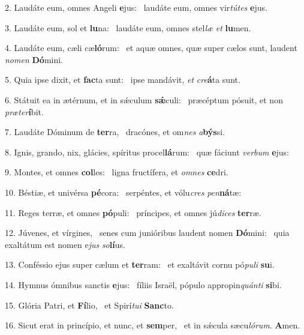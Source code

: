 2. Laudáte eum, omnes Angeli \textbf{e}jus: \ast\  laudáte eum, omnes vir\textit{tú}\textit{tes} \textbf{e}jus.\

3. Laudáte eum, sol et \textbf{lu}na: \ast\  laudáte eum, omnes stel\textit{læ} \textit{et} \textbf{lu}men.\

4. Laudáte eum, cæli cæ\textbf{ló}rum: \ast\  et aquæ omnes, quæ super cælos sunt, laudent \textit{no}\textit{men} \textbf{Dó}mini.\

5. Quia ipse dixit, et \textbf{fac}ta sunt: \ast\  ipse mandávit, \textit{et} \textit{cre}\textbf{á}ta sunt.\

6. Státuit ea in ætérnum, et in sǽculum \textbf{sǽ}culi: \ast\  præcéptum pósuit, et non \textit{præ}\textit{ter}\textbf{í}bit.\

7. Laudáte Dóminum de \textbf{ter}ra, \ast\  dracónes, et om\textit{nes} \textit{a}\textbf{býs}si.\

8. Ignis, grando, nix, glácies, spíritus procel\textbf{lá}rum: \ast\  quæ fáciunt \textit{ver}\textit{bum} \textbf{e}jus:\

9. Montes, et omnes \textbf{col}les: \ast\  ligna fructífera, et \textit{om}\textit{nes} \textbf{ce}dri.\

10. Béstiæ, et univérsa \textbf{pé}cora: \ast\  serpéntes, et vólu\textit{cres} \textit{pen}\textbf{ná}tæ:\

11. Reges terræ, et omnes \textbf{pó}puli: \ast\  príncipes, et omnes jú\textit{di}\textit{ces} \textbf{ter}ræ.\

12. Júvenes, et vírgines, \dag\  senes cum junióribus laudent nomen \textbf{Dó}mini: \ast\  quia exaltátum est nomen e\textit{jus} \textit{so}\textbf{lí}us.\

13. Conféssio ejus super cælum et \textbf{ter}ram: \ast\  et exaltávit cornu pó\textit{pu}\textit{li} \textbf{su}i.\

14. Hymnus ómnibus sanctis \textbf{e}jus: \ast\  fíliis Israël, pópulo appropin\textit{quán}\textit{ti} \textbf{si}bi.\

15. Glória Patri, et \textbf{Fí}lio, \ast\  et Spirí\textit{tu}\textit{i} \textbf{Sanc}to.\

16. Sicut erat in princípio, et nunc, et \textbf{sem}per, \ast\  et in sǽcula sæcu\textit{ló}\textit{rum}. \textbf{A}men.\

